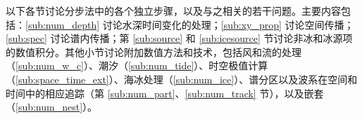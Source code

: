 \vspace{\baselineskip} \noindent 

以下各节讨论分步法中的各个独立步骤，以及与之相关的若干问题。主要内容包括：\para\ref{sub:num_depth} 讨论水深时间变化的处理；\para\ref{sub:xy_prop} 讨论空间传播；\para\ref{sub:spec} 讨论谱内传播；第 \ref{sub:source} 和 \ref{sub:icesource} 节讨论非冰和冰源项的数值积分。其他小节讨论附加数值方法和技术，包括风和流的处理（\para\ref{sub:num_w_c}）、潮汐（\para\ref{sub:num_tide}）、时空极值计算（\para\ref{sub:space_time_ext}）、海冰处理（\para\ref{sub:num_ice}）、谱分区以及波系在空间和时间中的相应追踪（第 \ref{sub:num_part}、\ref{sub:num_track} 节），以及嵌套（\para\ref{sub:num_nest}）。
